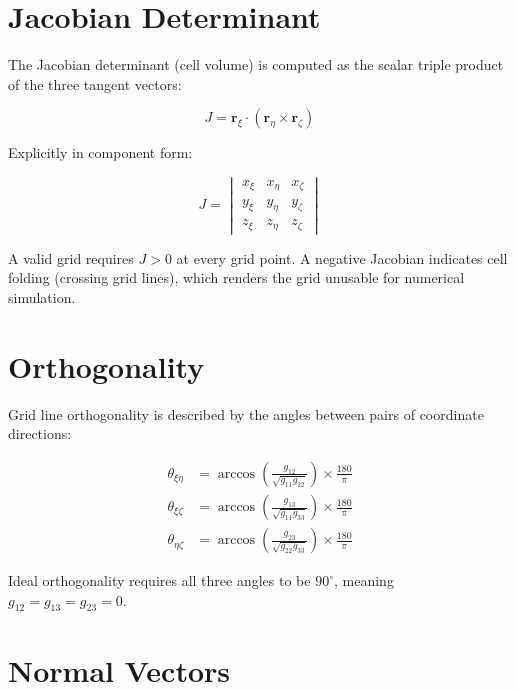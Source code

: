 \documentclass[11pt,a4paper]{report}
\newcommand{\rvec}{\bm{r}}
\begin{document}
\section{Jacobian Determinant}

The Jacobian determinant (cell volume) is computed as the scalar triple product of the three tangent vectors:

\begin{equation}
    J = \rvec_\xi \cdot (\rvec_\eta \times \rvec_\zeta)
\end{equation}

Explicitly in component form:

\begin{equation}
    J = \begin{vmatrix}
        x_\xi & x_\eta & x_\zeta \\
        y_\xi & y_\eta & y_\zeta \\
        z_\xi & z_\eta & z_\zeta
    \end{vmatrix}
\end{equation}

A valid grid requires $J > 0$ at every grid point. A negative Jacobian indicates cell folding (crossing grid lines), which renders the grid unusable for numerical simulation.

\section{Orthogonality}

Grid line orthogonality is described by the angles between pairs of coordinate directions:

\begin{align}
    \theta_{\xi\eta} &= \arccos \left( \frac{g_{12}}{\sqrt{g_{11} g_{22}}} \right) \times \frac{180}{\pi} \\
    \theta_{\xi\zeta} &= \arccos \left( \frac{g_{13}}{\sqrt{g_{11} g_{33}}} \right) \times \frac{180}{\pi} \\
    \theta_{\eta\zeta} &= \arccos \left( \frac{g_{23}}{\sqrt{g_{22} g_{33}}} \right) \times \frac{180}{\pi}
\end{align}

Ideal orthogonality requires all three angles to be $90^\circ$, meaning $g_{12} = g_{13} = g_{23} = 0$.

\section{Normal Vectors}
\end{document}
